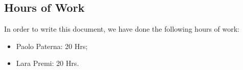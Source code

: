 \documentclass[12pt,a4paper]{article}
\begin{document}
	
	\tableofcontents
	
	
	\subsection{Hours of Work}
	In order to write this document, we have done the following hours of work:
	\begin{itemize}
	\item Paolo Paterna: 20 Hrs;
	\item Lara Premi: 20 Hrs.
	\end{itemize}
\end{document}
